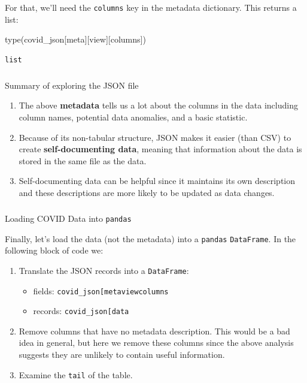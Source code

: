 \documentclass[
  letterpaper,
  DIV=11,
  numbers=noendperiod]{scrreprt}
\makeatletter
\let\oldsubparagraph\subparagraph
\renewcommand{\subparagraph}{
    \@ifstar
      \xxxSubParagraphStar
      \xxxSubParagraphNoStar
  }
\newcommand{\xxxSubParagraphStar}[1]{\oldsubparagraph*{#1}\mbox{}}
\newcommand{\xxxSubParagraphNoStar}[1]{\oldsubparagraph{#1}\mbox{}}
\newenvironment{Shaded}{\begin{snugshade}}{\end{snugshade}}
\newcommand{\BuiltInTok}[1]{\textcolor[rgb]{0.00,0.23,0.31}{#1}}
\newcommand{\NormalTok}[1]{\textcolor[rgb]{0.00,0.23,0.31}{#1}}
\newcommand{\StringTok}[1]{\textcolor[rgb]{0.13,0.47,0.30}{#1}}
\providecommand{\tightlist}{%
  \setlength{\itemsep}{0pt}\setlength{\parskip}{0pt}}\usepackage{longtable,booktabs,array}
\makeatother
\begin{document}
For that, we'll need the \texttt{columns} key in the metadata
dictionary. This returns a list:

\begin{Shaded}
\begin{Highlighting}[]
\BuiltInTok{type}\NormalTok{(covid\_json[}\StringTok{\textquotesingle{}meta\textquotesingle{}}\NormalTok{][}\StringTok{\textquotesingle{}view\textquotesingle{}}\NormalTok{][}\StringTok{\textquotesingle{}columns\textquotesingle{}}\NormalTok{])}
\end{Highlighting}
\end{Shaded}

\begin{verbatim}
list
\end{verbatim}

\subparagraph{Summary of exploring the JSON
file}\label{summary-of-exploring-the-json-file}

\begin{enumerate}
\def\labelenumi{\arabic{enumi}.}
\tightlist
\item
  The above \textbf{metadata} tells us a lot about the columns in the
  data including column names, potential data anomalies, and a basic
  statistic.
\item
  Because of its non-tabular structure, JSON makes it easier (than CSV)
  to create \textbf{self-documenting data}, meaning that information
  about the data is stored in the same file as the data.
\item
  Self-documenting data can be helpful since it maintains its own
  description and these descriptions are more likely to be updated as
  data changes.
\end{enumerate}

\subparagraph{\texorpdfstring{Loading COVID Data into
\texttt{pandas}}{Loading COVID Data into pandas}}\label{loading-covid-data-into-pandas}

Finally, let's load the data (not the metadata) into a \texttt{pandas}
\texttt{DataFrame}. In the following block of code we:

\begin{enumerate}
\def\labelenumi{\arabic{enumi}.}
\item
  Translate the JSON records into a \texttt{DataFrame}:

  \begin{itemize}
  \tightlist
  \item
    fields:
    \texttt{covid\_json{[}\textquotesingle{}meta\textquotesingle{}{]}{[}\textquotesingle{}view\textquotesingle{}{]}{[}\textquotesingle{}columns\textquotesingle{}{]}}
  \item
    records:
    \texttt{covid\_json{[}\textquotesingle{}data\textquotesingle{}{]}}
  \end{itemize}
\item
  Remove columns that have no metadata description. This would be a bad
  idea in general, but here we remove these columns since the above
  analysis suggests they are unlikely to contain useful information.
\item
  Examine the \texttt{tail} of the table.
\end{enumerate}
\end{document}
